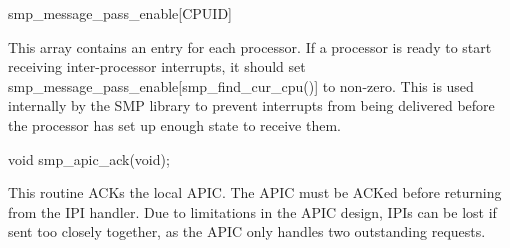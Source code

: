 \begin{apisyn} 
        smp_message_pass_enable[CPUID]
\end{apisyn}
\begin{apidesc}
	This array contains an entry for each processor.
	If a processor is ready to start receiving inter-processor
	interrupts, it should set
	smp_message_pass_enable[smp_find_cur_cpu()] to non-zero.
	This is used internally by the SMP library to prevent
	interrupts from being delivered before the processor has
	set up enough state to receive them.
\end{apidesc} 


\begin{apisyn}

        \funcproto void smp_apic_ack(void);
\end{apisyn}
\begin{apidesc}
	This routine ACKs the local APIC\@.
	The APIC must be ACKed before returning from the IPI handler.
	Due to limitations in the APIC design,
	IPIs can be lost if sent too closely together,
	as the APIC only handles two outstanding requests.
\end{apidesc}

